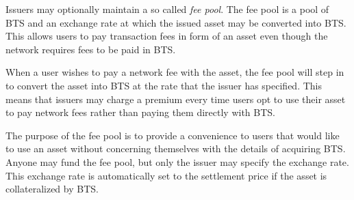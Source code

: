\label{seq:feepool}

Issuers may optionally maintain a so called \emph{fee pool}. The fee pool is a
pool of BTS and an exchange rate at which the issued asset may be converted
into BTS. This allows users to pay transaction fees in form of an asset even
though the network requires fees to be paid in BTS.

When a user wishes to pay a network fee with the asset, the fee pool will step
in to convert the asset into BTS at the rate that the issuer has specified.
This means that issuers may charge a premium every time users opt to use their
asset to pay network fees rather than paying them directly with BTS.

The purpose of the fee pool is to provide a convenience to users that would
like to use an asset without concerning themselves with the details of
acquiring BTS. Anyone may fund the fee pool, but only the issuer may specify
the exchange rate. This exchange rate is automatically set to the settlement
price if the asset is collateralized by BTS.
